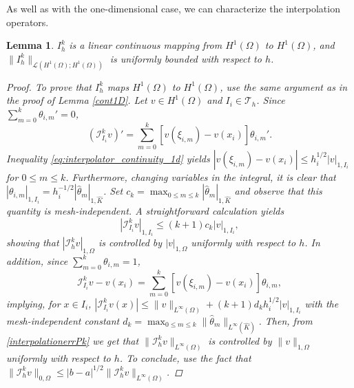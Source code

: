 \documentclass{article}
\newtheorem{lemma}{Lemma}
\begin{document}
As well as with the one-dimensional case, we can characterize the interpolation operators.
\begin{lemma}
    $I_h^k$ is a linear continuous mapping from $H^1(\Omega)$ to $H^1(\Omega)$, and $\|I_h^k\|_{\mathcal{L}(H^1(\Omega);H^1(\Omega))}$ is uniformly bounded with respect to $h$.
\begin{proof}
    To prove that $I_h^k$ maps $H^1(\Omega)$ to $H^1(\Omega)$, use the same argument as in the proof of Lemma \ref{cont1D}.
    Let $v \in H^1(\Omega)$ and $I_i \in \mathcal{T}_h$. Since $\sum_{m=0}^k \theta_{i,m}' = 0$,
    $$ (\mathcal{I}_{I_i}^k v)' = \sum_{m=0}^k [v(\xi_{i,m}) - v(x_i)] \theta_{i,m}'. $$
    Inequality \ref{eq:interpolator_continuity_1d} yields $|v(\xi_{i,m}) - v(x_i)| \le h_i^{1/2} |v|_{1,I_i}$ for $0 \le m \le k$. Furthermore, changing variables in the integral, it is clear that $|\theta_{i,m}|_{1,I_i} = h_i^{-1/2} |\hat{\theta}_m|_{1,\hat{K}}$. Set $c_k = \max_{0 \le m \le k} |\hat{\theta}_m|_{1,\hat{K}}$ and observe that this quantity is mesh-independent. A straightforward calculation yields
    $$ |\mathcal{I}_{I_i}^k v|_{1,I_i} \le (k+1) c_k |v|_{1,I_i}, $$
    showing that $|\mathcal{I}_h^k v|_{1,\Omega}$ is controlled by $|v|_{1,\Omega}$ uniformly with respect to $h$. In addition, since $\sum_{m=0}^k \theta_{i,m} = 1$,
    $$ \mathcal{I}_{I_i}^k v - v(x_i) = \sum_{m=0}^k [v(\xi_{i,m}) - v(x_i)] \theta_{i,m}, $$
    implying, for $x \in I_i$, $|\mathcal{I}_{I_i}^k v(x)| \le \|v\|_{L^\infty(\Omega)} + (k+1) d_k h_i^{1/2} |v|_{1,I_i}$ with the mesh-independent constant $d_k = \max_{0 \le m \le k} \|\hat{\theta}_m\|_{L^\infty(\hat{K})}$. Then, from \ref{interpolationerrPk} we get that $\|\mathcal{I}_h^k v\|_{L^\infty(\Omega)}$ is controlled by $\|v\|_{1,\Omega}$ uniformly with respect to $h$. To conclude, use the fact that $\|\mathcal{I}_h^k v\|_{0,\Omega} \le |b-a|^{1/2} \|\mathcal{I}_h^k v\|_{L^\infty(\Omega)}$.
\end{proof}
\end{lemma}
\end{document}
